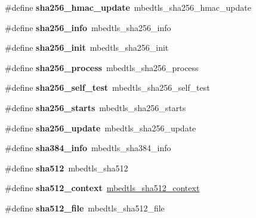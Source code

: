 \begin{DoxyCompactItemize}
\#define {\bfseries sha256\+\_\+hmac\+\_\+update}~mbedtls\+\_\+sha256\+\_\+hmac\+\_\+update
\item 
\mbox{\label{compat-1_83_8h_a2166437e69e9a40649fcab07f215abb2}} 
\#define {\bfseries sha256\+\_\+info}~mbedtls\+\_\+sha256\+\_\+info
\item 
\mbox{\label{compat-1_83_8h_a509e59da6cfc7c14458d5a26e7a38c96}} 
\#define {\bfseries sha256\+\_\+init}~mbedtls\+\_\+sha256\+\_\+init
\item 
\mbox{\label{compat-1_83_8h_a65d3246fd185da4f76ecb65451e53f99}} 
\#define {\bfseries sha256\+\_\+process}~mbedtls\+\_\+sha256\+\_\+process
\item 
\mbox{\label{compat-1_83_8h_a9dfaa6c582042ddecafdce18e0606b4c}} 
\#define {\bfseries sha256\+\_\+self\+\_\+test}~mbedtls\+\_\+sha256\+\_\+self\+\_\+test
\item 
\mbox{\label{compat-1_83_8h_a43ba6128d31c027107f860f04589182e}} 
\#define {\bfseries sha256\+\_\+starts}~mbedtls\+\_\+sha256\+\_\+starts
\item 
\mbox{\label{compat-1_83_8h_a345ad11b5b46c24916432cb7764a9ba9}} 
\#define {\bfseries sha256\+\_\+update}~mbedtls\+\_\+sha256\+\_\+update
\item 
\mbox{\label{compat-1_83_8h_a3a1cd6005dcad110185001975ed74905}} 
\#define {\bfseries sha384\+\_\+info}~mbedtls\+\_\+sha384\+\_\+info
\item 
\mbox{\label{compat-1_83_8h_aaa9557212a92da31b26443d6e2a7c7b3}} 
\#define {\bfseries sha512}~mbedtls\+\_\+sha512
\item 
\mbox{\label{compat-1_83_8h_ab600cf7a614bd1279982d08dc9ae553e}} 
\#define {\bfseries sha512\+\_\+context}~\mbox{\hyperlink{structmbedtls__sha512__context}{mbedtls\+\_\+sha512\+\_\+context}}
\item 
\mbox{\label{compat-1_83_8h_a63f45a83d0cb30dec073a9c9c9339a0a}} 
\#define {\bfseries sha512\+\_\+file}~mbedtls\+\_\+sha512\+\_\+file
\item 

\end{DoxyCompactItemize}
